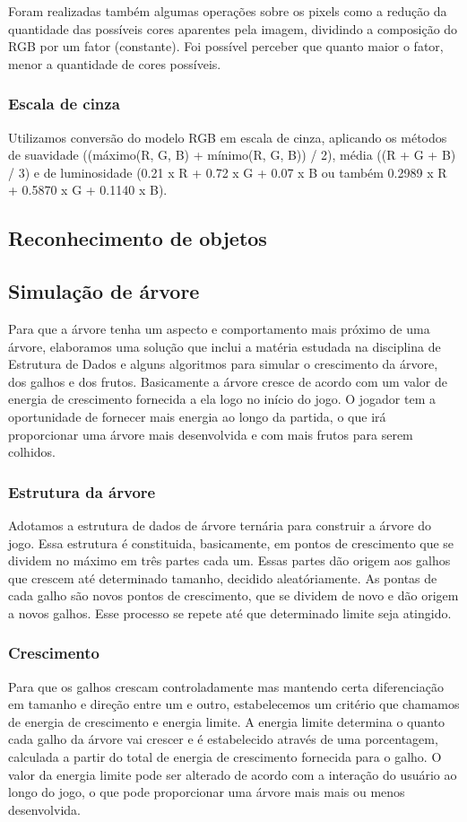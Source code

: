 \documentclass[12pt]{article}
\begin{document}
Foram realizadas tamb\'em algumas opera\c c\~oes sobre os pixels como a redu\c c\~ao da quantidade
das poss\'iveis cores aparentes pela imagem, dividindo a composi\c c\~ao do RGB por um fator (constante).
Foi poss\'ivel perceber que quanto maior o fator, menor a quantidade de cores poss\'iveis.

\subsubsection{Escala de cinza}
Utilizamos convers\~ao do modelo RGB em escala de cinza, aplicando os m\'etodos de suavidade
((m\'aximo(R, G, B) + m\'inimo(R, G, B)) / 2), m\'edia ((R + G + B) / 3) e de luminosidade
(0.21 x R + 0.72 x G + 0.07 x B ou tamb\'em 0.2989 x R + 0.5870 x G + 0.1140 x B).

\subsection{Reconhecimento de objetos}

\subsection{Simulação de árvore}
Para que a árvore tenha um aspecto e comportamento mais próximo de uma árvore, elaboramos uma solução que inclui
a matéria estudada na disciplina de Estrutura de Dados e alguns algoritmos para simular o crescimento da árvore,
dos galhos e dos frutos. Basicamente a \'arvore cresce de acordo com um valor de energia de crescimento fornecida
a ela logo no in\'icio do jogo. O jogador tem a oportunidade de fornecer mais energia ao longo da partida, o que
ir\'a proporcionar uma \'arvore mais desenvolvida e com mais frutos para serem colhidos.

\subsubsection{Estrutura da árvore}
Adotamos a estrutura de dados de \'arvore ternária para construir a \'arvore do jogo. Essa estrutura \'e constituida, basicamente,
em pontos de crescimento que se dividem no m\'aximo em tr\^es partes cada um. Essas partes d\~ao origem aos galhos que crescem at\'e
determinado tamanho, decidido aleat\'oriamente. As pontas de cada galho s\~ao novos pontos de crescimento,
que se dividem de novo e d\~ao origem a novos galhos. Esse processo se repete at\'e que determinado limite seja atingido.

\subsubsection{Crescimento}
Para que os galhos crescam controladamente mas mantendo certa diferencia\c c\~ao em tamanho e
dire\c c\~ao entre um e outro, estabelecemos um crit\'erio que chamamos de energia de crescimento e energia limite.
A energia limite determina o quanto cada  galho da \'arvore vai crescer e \'e estabelecido atrav\'es de uma porcentagem,
calculada a partir do total de energia de crescimento fornecida para o galho. O valor da energia limite pode
ser alterado de acordo com a intera\c c\~ao do usu\'ario ao longo do jogo, o que pode proporcionar uma \'arvore mais
mais ou menos desenvolvida.
\end{document}
